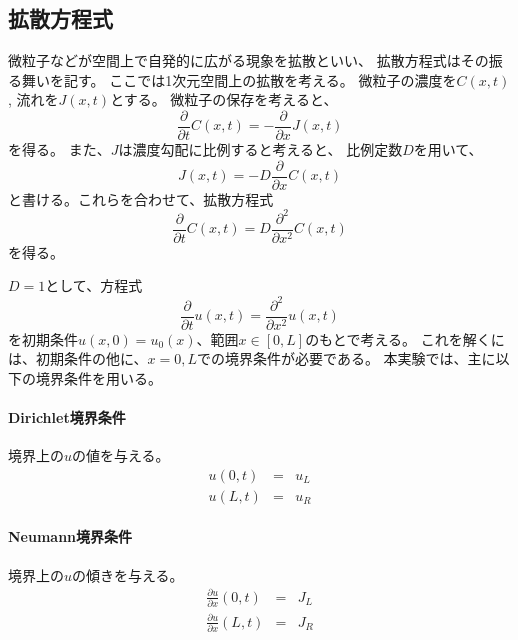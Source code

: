 \documentclass[a4j, titlepage]{jsarticle}
\numberwithin{equation}{section}
\begin{document}
    \subsection{拡散方程式}
        微粒子などが空間上で自発的に広がる現象を拡散といい、
        拡散方程式はその振る舞いを記す。
        ここでは1次元空間上の拡散を考える。
        微粒子の濃度を$C(x, t)$,
        流れを$J(x, t)$とする。
        微粒子の保存を考えると、
        \begin{equation}
            \frac{\partial}{\partial t}C(x, t) = -\frac{\partial}{\partial x}J(x, t) \label{equ:conservation}
        \end{equation}
        を得る。
        また、$J$は濃度勾配に比例すると考えると、
        比例定数$D$を用いて、
        \begin{equation}
            J(x, t) = -D\frac{\partial}{\partial x}C(x, t) \label{equ:slope}
        \end{equation}
        と書ける。これらを合わせて、拡散方程式
        \begin{equation*}
            \frac{\partial}{\partial t}C(x, t) = D\frac{\partial^2}{\partial x^2}C(x, t)
        \end{equation*}
        を得る。

        $D=1$として、方程式
        \begin{equation}
            \frac{\partial}{\partial t}u(x, t) = \frac{\partial^2}{\partial x^2}u(x, t) \label{equ:diffusion}
        \end{equation}
        を初期条件$u(x, 0) = u_0(x)$、範囲$x\in[0, L]$のもとで考える。
        これを解くには、初期条件の他に、$x=0,L$での境界条件が必要である。
        本実験では、主に以下の境界条件を用いる。

        \paragraph{Dirichlet境界条件}
            境界上の$u$の値を与える。
            \begin{eqnarray*}
                u(0, t) &=& u_L \\
                u(L, t) &=& u_R
            \end{eqnarray*}

        \paragraph{Neumann境界条件}
            境界上の$u$の傾きを与える。
            \begin{eqnarray*}
                \frac{\partial u}{\partial x}(0, t) &=& J_L \\
                \frac{\partial u}{\partial x}(L, t) &=& J_R \\
            \end{eqnarray*}
\end{document}
